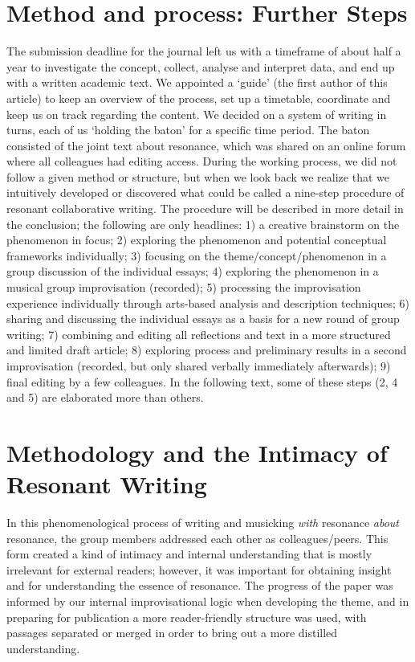 \begin{adjmulticols}{2}{0mm}{0mm}
\chapter{Method and process: Further Steps}
The submission deadline for the journal left us with a timeframe of about half a year to investigate the concept, collect, analyse and interpret data, and end up with a written academic text. We appointed a ‘guide’ (the first author of this article) to keep an overview of the process, set up a timetable, coordinate and keep us on track regarding the content. We decided on a system of writing in turns, each of us ‘holding the baton’ for a specific time period. The baton consisted of the joint text about resonance, which was shared on an online forum where all colleagues had editing access. During the working process, we did not follow a given method or structure, but when we look back we realize that we intuitively developed or discovered what could be called a nine-step procedure of resonant collaborative writing. The procedure will be described in more detail in the conclusion; the following are only headlines: 1) a creative brainstorm on the phenomenon in focus; 2) exploring the phenomenon and potential conceptual frameworks individually; 3) focusing on the theme/concept/phenomenon in a group discussion of the individual essays; 4) exploring the phenomenon in a musical group improvisation (recorded); 5) processing the improvisation experience individually through arts-based analysis and description techniques; 6) sharing and discussing the individual essays as a basis for a new round of group writing; 7) combining and editing all reflections and text in a more structured and limited draft article; 8) exploring process and preliminary results in a second improvisation (recorded, but only shared verbally immediately afterwards); 9) final editing by a few colleagues. In the following text, some of these steps (2, 4 and 5) are elaborated more than others.

\chapter{Methodology and the Intimacy of Resonant Writing}
In this phenomenological process of writing and musicking \textit{with} resonance \textit{about} resonance, the group members addressed each other as colleagues/peers. This form created a kind of intimacy and internal understanding that is mostly irrelevant for external readers; however, it was important for obtaining insight and for understanding the essence of resonance. The progress of the paper was informed by our internal improvisational logic when developing the theme, and in preparing for publication a more reader-friendly structure was used, with passages separated or merged in order to bring out a more distilled understanding.


\end{adjmulticols}
